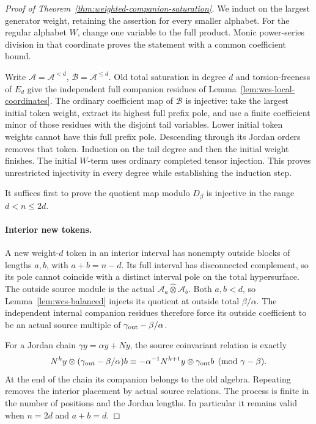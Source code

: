 \begin{proof}[Proof of Theorem~\ref{thm:weighted-companion-saturation}]
We induct on the largest generator weight, retaining the
assertion for every smaller alphabet.  For the regular
alphabet \(W\), change one variable to the full product.
Monic power-series division in that coordinate proves the
statement with a common coefficient bound.

Write \(\mathcal A=\mathcal A^{<d}\),
\(\mathcal B=\mathcal A^{\leq d}\).  Old total saturation
in degree \(d\) and torsion-freeness of \(E_d\) give the
independent full companion residues of Lemma~\ref{lem:wcs-local-coordinates}.  The ordinary
coefficient map of \(\mathcal B\) is injective: take the
largest initial token weight, extract its highest full
prefix pole, and use a finite coefficient minor of those
residues with the disjoint tail variables.  Lower initial
token weights cannot have this full prefix pole.
Descending through its Jordan orders removes that token.
Induction on the tail degree and then the initial weight
finishes.  The initial \(W\)-term uses ordinary completed
tensor injection.  This proves unrestricted injectivity
in every degree while establishing the induction step.

It suffices first to prove the quotient map modulo
\(D_\beta\) is injective in the range \(d<n\leq2d\).

\paragraph{Interior new tokens.}
A new weight-\(d\) token in an interior interval has
nonempty outside blocks of lengths \(a,b\), with
\(a+b=n-d\).  Its full interval has disconnected complement,
so its pole cannot coincide with a distinct interval pole
on the total hypersurface.  The outside source module is
the actual \(\mathcal A_a\widehat\otimes\mathcal A_b\).
Both \(a,b<d\), so
Lemma~\ref{lem:wcs-balanced} injects its quotient at outside
total \(\beta/\alpha\).  The independent internal companion
residues therefore force its outside coefficient to be an
actual source multiple of
\(\gamma_{\rm out}-\beta/\alpha\).

For a Jordan chain \(\gamma y=\alpha y+Ny\), the source
coinvariant relation is exactly
\begin{equation}\label{eq:wcs-Jordan}
 N^k y\otimes(\gamma_{\rm out}-\beta/\alpha)b
 \equiv-\alpha^{-1}N^{k+1}y\otimes\gamma_{\rm out}b
                                      \pmod{\gamma-\beta}.
\end{equation}
At the end of the chain its companion belongs to the old
algebra.  Repeating removes the interior placement by
actual source relations.  The process is finite in the
number of positions and the Jordan lengths.  In particular
it remains valid when \(n=2d\) and \(a+b=d\).


\end{proof}
